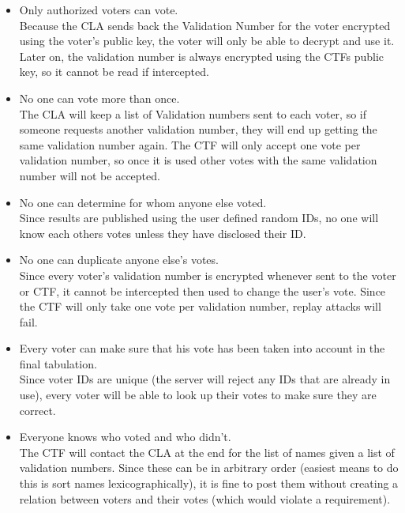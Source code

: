 \documentclass{article}
\begin{document}
\begin{itemize}
  \item Only authorized voters can vote. \\
		Because the CLA sends back the Validation Number for the voter encrypted using the voter's public key, the voter will only be able to decrypt and use it. Later on, the validation number is always encrypted using the CTFs public key, so it cannot be read if intercepted.
	\item No one can vote more than once. \\
		The CLA will keep a list of Validation numbers sent to each voter, so if someone requests another validation number, they will end up getting the same validation number again. The CTF will only accept one vote per validation number, so once it is used other votes with the same validation number will not be accepted.
	\item No one can determine for whom anyone else voted. \\
		Since results are published using the user defined random IDs, no one will know each others votes unless they have disclosed their ID.
	\item No one can duplicate anyone else's votes. \\
		Since every voter's validation number is encrypted whenever sent to the voter or CTF, it cannot be intercepted then used to change the user's vote. Since the CTF will only take one vote per validation number, replay attacks will fail.	
	\item Every voter can make sure that his vote has been taken into account in the final tabulation. \\
		Since voter IDs are unique (the server will reject any IDs that are already in use), every voter will be able to look up their votes to make sure they are correct.
	\item Everyone knows who voted and who didn't. \\
		The CTF will contact the CLA at the end for the list of names given a list of validation numbers. Since these can be in arbitrary order (easiest means to do this is sort names lexicographically), it is fine to post them without creating a relation between voters and their votes (which would violate a requirement). 
\end{itemize}
\end{document}

